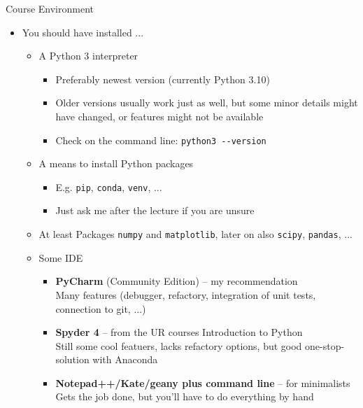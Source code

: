 \begin{frame}{Course Environment}
%
\begin{itemize}
\item You should have installed ...
	\begin{itemize}
	\item A Python 3 interpreter
		\begin{itemize}
		\item Preferably newest version (currently Python 3.10)
		\item Older versions usually work just as well, but some minor details might have changed, or features might not be available
		\item Check on the command line: \texttt{python3 -{}-version}
		\end{itemize}
	\item A means to install Python packages
		\begin{itemize}
		\item E.\;g. \texttt{pip}, \texttt{conda}, \texttt{venv}, ...
		\item Just ask me after the lecture if you are unsure
		\end{itemize}
	\item At least Packages \texttt{numpy} and \texttt{matplotlib}, later on also \texttt{scipy}, \texttt{pandas}, ...
	\item Some IDE
		\begin{itemize}
		\item \textbf{PyCharm} (Community Edition) -- my recommendation\\
			Many features (debugger, refactory, integration of unit tests, connection to git, ...)
		\item \textbf{Spyder 4} -- from the UR courses Introduction to Python\\
			Still some cool featuers, lacks refactory options, but good one-stop-solution with Anaconda
		\item \textbf{Notepad++/Kate/geany plus command line} -- for minimalists\\
			Gets the job done, but you'll have to do everything by hand
		\end{itemize}
	\end{itemize}
\end{itemize}
%
\end{frame}


